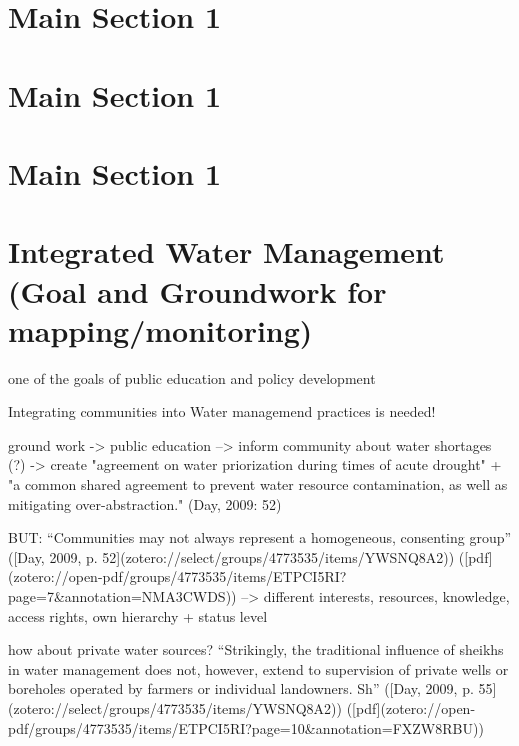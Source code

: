 \section{Main Section 1}


\section{Main Section 1}


\section{Main Section 1}


\section{Integrated Water Management (Goal and Groundwork for mapping/monitoring)}
one of the goals of public education and policy development


Integrating communities into Water managemend practices is needed!

ground work -> public education --> inform community about water shortages (?) -> create "agreement on water priorization during times of acute drought" + "a common shared agreement to prevent water resource contamination, as well as mitigating over-abstraction." (Day, 2009: 52)

BUT:
“Communities may not always represent a homogeneous, consenting group” ([Day, 2009, p. 52](zotero://select/groups/4773535/items/YWSNQ8A2)) ([pdf](zotero://open-pdf/groups/4773535/items/ETPCI5RI?page=7&annotation=NMA3CWDS))
--> different interests, resources, knowledge, access rights, own hierarchy + status level

how about private water sources?
“Strikingly, the traditional influence of sheikhs in water management does not, however, extend to supervision of private wells or boreholes operated by farmers or individual landowners. Sh” ([Day, 2009, p. 55](zotero://select/groups/4773535/items/YWSNQ8A2)) ([pdf](zotero://open-pdf/groups/4773535/items/ETPCI5RI?page=10&annotation=FXZW8RBU))

